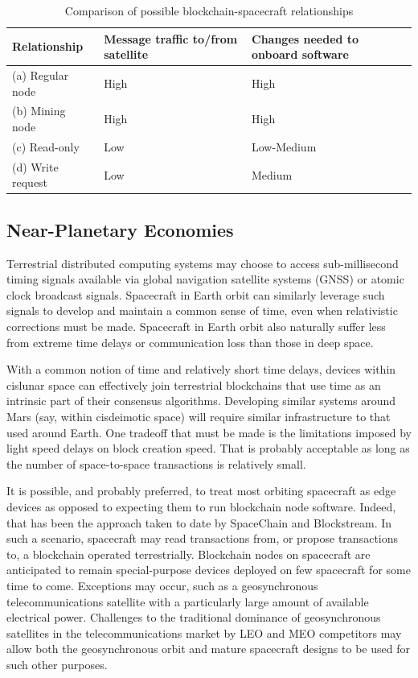 \documentclass[journal ]{new-aiaa}
\begin{document}
\begin{table}[hbt!]
\caption{Comparison of possible blockchain-spacecraft relationships}
 \label{t:tab1-spacecraft-rels}
\centering
\begin{tabular}{lll}
\hline
Relationship    & Message traffic to/from satellite & Changes needed to onboard software \\
\hline
(a) Regular node      & High    & High      \\
(b) Mining node       & High     & High      \\
(c) Read-only       & Low     & Low-Medium      \\
(d) Write request & Low      & Medium       \\
\hline
\end{tabular}
\end{table}


\subsection{Near-Planetary Economies}

Terrestrial distributed computing systems may choose to access sub-millisecond timing signals available via global navigation satellite systems (GNSS) or atomic clock broadcast signals. Spacecraft in Earth orbit can similarly leverage such signals to develop and maintain a common sense of time, even when relativistic corrections must be made. Spacecraft in Earth orbit also naturally suffer less from extreme time delays or communication loss than those in deep space. 

With a common notion of time and relatively short time delays, devices within cislunar space can effectively join terrestrial blockchains that use time as an intrinsic part of their consensus algorithms. Developing similar systems around Mars (say, within cisdeimotic space) will require similar infrastructure to that used around Earth. One tradeoff that must be made is the limitations imposed by light speed delays on block creation speed. That is probably acceptable as long as the number of space-to-space transactions is relatively small.

It is possible, and probably preferred, to treat most orbiting spacecraft as edge devices as opposed to expecting them to run blockchain node software. Indeed, that has been the approach taken to date by SpaceChain and Blockstream. In such a scenario, spacecraft may read transactions from, or propose transactions to, a blockchain operated terrestrially. Blockchain nodes on spacecraft are anticipated to remain special-purpose devices deployed on few spacecraft for some time to come. Exceptions may occur, such as a geosynchronous telecommunications satellite with a particularly large amount of available electrical power. Challenges to the traditional dominance of geosynchronous satellites in the telecommunications market by LEO and MEO competitors may allow both the geosynchronous orbit and mature spacecraft designs to be used for such other purposes.
\end{document}
